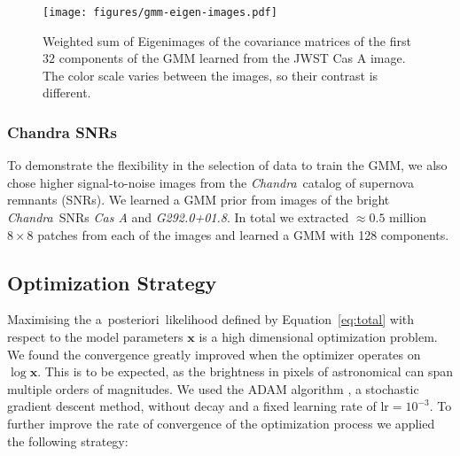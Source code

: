 \documentclass[twocolumn]{aastex631}
\newcommand{\chandra}{\textit{Chandra}~}
\newcommand{\aposteriori}{a~posteriori~}
\newcommand{\todo}[1]{\textcolor{red}{TODO: #1}\PackageWarning{TODO:}{#1!}}
\begin{document}

    \begin{figure}
        \begin{centering}
            \texttt{[image: figures/gmm-eigen-images.pdf]}
            \caption{
                Weighted sum of Eigenimages of the covariance matrices of the first $32$ components of the GMM learned from the JWST Cas A image. The color scale varies between the images, so their contrast is different. 
            }
            \label{fig:gmm-eigen-images}
        \end{centering}
    \end{figure}

    \subsubsection{Chandra SNRs}
    \label{sssec:chandra-snrs}
    To demonstrate the flexibility in the selection of data to train the GMM, we also chose higher signal-to-noise images from the \chandra catalog of supernova remnants (SNRs). We learned a GMM prior from images of the bright \chandra SNRs \textit{Cas A} and \textit{G292.0+01.8}. In total we extracted $\approx 0.5$ million $8\times 8$ patches from each of the images and learned a GMM with 128 components.

    \subsection{Optimization Strategy}
    \label{sec:opt-strategy}
    Maximising the \aposteriori likelihood defined by Equation~\ref{eq:total} with respect to the model parameters $\mathbf{x}$ is a high dimensional optimization problem. We found the convergence greatly improved when the optimizer operates on $\log{\mathbf{x}}$. This is to be expected, as the brightness in pixels of astronomical can span multiple orders of magnitudes. We used the ADAM algorithm \citep{Kingma2014}, a stochastic gradient descent method, without decay and a fixed learning rate of $\mathrm{lr}=10^{-3}$. To further improve the rate of convergence of the optimization process we applied the following strategy:
\end{document}
